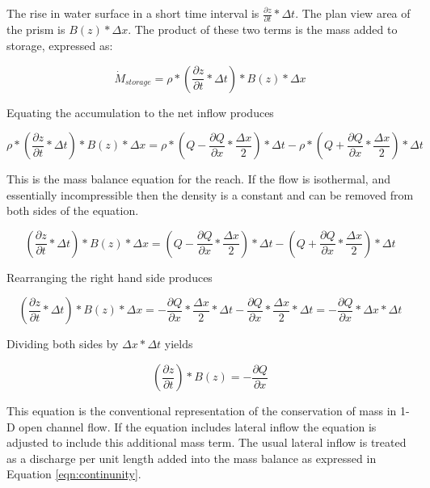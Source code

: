 The rise in water surface in a short time interval is $\frac{\partial z}{\partial t}*\Delta t$.
The plan view area of the prism is $B(z)* \Delta x$.
The product of these two terms is the mass added to storage, expressed as:

\begin{equation}
\dot{M}_{storage} = \rho *( \frac{\partial z}{\partial t}*\Delta t) *B(z)* \Delta x 
\end{equation}

Equating the accumulation to the net inflow produces 

\begin{equation}
 \rho *( \frac{\partial z}{\partial t}*\Delta t) *B(z)* \Delta x =  \rho * ( Q-\frac{\partial Q}{\partial x}*\frac{\Delta x}{2})*\Delta t - \rho * ( Q+\frac{\partial Q}{\partial x}*\frac{\Delta x}{2})*\Delta t
\end{equation}

This is the mass balance equation for the reach.  If the flow is isothermal, and essentially incompressible then the density is a constant and can be removed from both sides of the equation.  

\begin{equation}
( \frac{\partial z}{\partial t}*\Delta t) *B(z)* \Delta x =  ( Q-\frac{\partial Q}{\partial x}*\frac{\Delta x}{2})*\Delta t - ( Q+\frac{\partial Q}{\partial x}*\frac{\Delta x}{2})*\Delta t
\end{equation}

Rearranging the right hand side produces

\begin{equation}
( \frac{\partial z}{\partial t}*\Delta t) *B(z)* \Delta x =  -\frac{\partial Q}{\partial x}*\frac{\Delta x}{2}*\Delta t - \frac{\partial Q}{\partial x}*\frac{\Delta x}{2}*\Delta t = -\frac{\partial Q}{\partial x}*\Delta x*\Delta t
\end{equation}

Dividing both sides by $\Delta x*\Delta t$ yields

\begin{equation}
( \frac{\partial z}{\partial t}) *B(z) = -\frac{\partial Q}{\partial x}
\end{equation}

This equation is the conventional representation of the conservation of mass in 1-D open channel flow.   If the equation includes lateral inflow the equation is adjusted to include this additional mass term.  The usual lateral inflow is treated as a discharge per unit length added into the mass balance as expressed in Equation \ref{eqn:continunity}.

